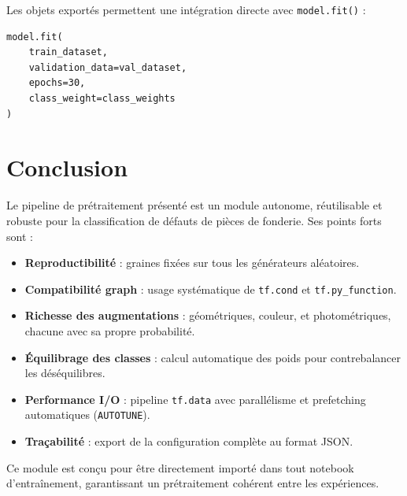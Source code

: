 Les objets exportés permettent une intégration directe avec \texttt{model.fit()} :

\begin{lstlisting}[caption={Entraînement avec les datasets prétraités}]
model.fit(
    train_dataset,
    validation_data=val_dataset,
    epochs=30,
    class_weight=class_weights
)
\end{lstlisting}

\section{Conclusion}

Le pipeline de prétraitement présenté est un module autonome, réutilisable et robuste pour la classification de défauts de pièces de fonderie. Ses points forts sont :

\begin{itemize}
  \item \textbf{Reproductibilité} : graines fixées sur tous les générateurs aléatoires.
  \item \textbf{Compatibilité graph} : usage systématique de \texttt{tf.cond} et \texttt{tf.py\_function}.
  \item \textbf{Richesse des augmentations} : géométriques, couleur, et photométriques, chacune avec sa propre probabilité.
  \item \textbf{Équilibrage des classes} : calcul automatique des poids pour contrebalancer les déséquilibres.
  \item \textbf{Performance I/O} : pipeline \texttt{tf.data} avec parallélisme et prefetching automatiques (\texttt{AUTOTUNE}).
  \item \textbf{Traçabilité} : export de la configuration complète au format JSON.
\end{itemize}

Ce module est conçu pour être directement importé dans tout notebook d'entraînement, garantissant un prétraitement cohérent entre les expériences.

